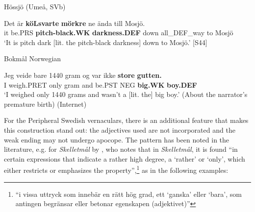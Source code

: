 
\item 

Hössjö (Umeå, SVb)



 \ea\label{}
\gll Det  är  \textbf{köLsvarte}\textbf{  mörkre} ne  ända  till  Mosjö.  \\


it  be.PRS  \textbf{pitch-black.WK} \textbf{darkness.DEF} down  all\_DEF\_way  to  Mosjö  \\

\glt ‘It is pitch dark [lit. the pitch-black darkness] down to Mosjö.’ [S44]

\z

\item 

Bokmål Norwegian



 \ea\label{}
\gll Jeg  veide  bare  1440  gram  og  var  ikke  \textbf{store} \textbf{gutten.}\\


I  weigh.PRET  only    gram  and  be.PST  NEG  \textbf{big.WK} \textbf{boy.DEF}\\

\glt ‘I weighed only 1440 grams and wasn’t a [lit. the] big boy.’ (About the narrator’s premature birth) (Internet) 

\z

For the Peripheral Swedish vernaculars, there is an additional feature that makes this construction stand out: the adjectives used are not incorporated and the weak ending may not undergo apocope. The pattern has been noted in the literature, e.g. for \textit{Skelletmål} by \citet[34]{Marklund1976}, who notes that in \textit{Skelletmål}, it is found “in certain expressions that indicate a rather high degree, a ‘rather’ or ‘only’, which either restricts or emphasizes the property”,\footnote{ “i vissa uttryck som innebär en rätt hög grad, ett ‘ganska’ eller ‘bara’, som antingen begränsar eller betonar egenskapen (adjektivet)”} as in the following examples:

